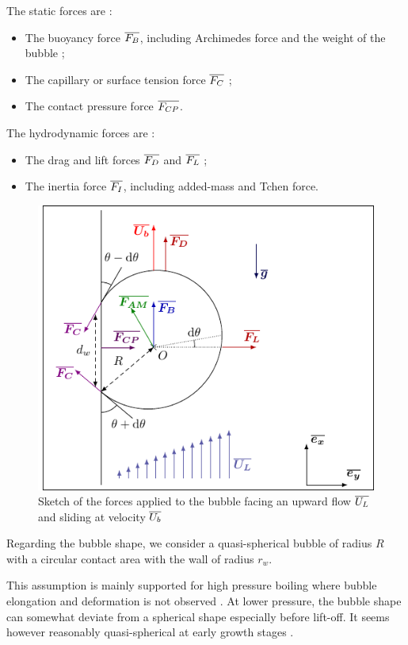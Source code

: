 \npar

The static forces are : 

\begin{itemize}
\item The buoyancy force $\overline{F_{B}}$, including Archimedes force and the weight of the bubble ;
\item The capillary or surface tension force $\overline{F_{C}}$ ;
\item The contact pressure force $\overline{F_{CP}}$.
\end{itemize}


The hydrodynamic forces are :

\begin{itemize}
\item The drag and lift forces $\overline{F_{D}}$ and $\overline{F_{L}}$ ;
\item The inertia force $\overline{F_{I}}$, including added-mass and Tchen force.
\end{itemize}



\begin{figure}[h!]
\centering
%
\includegraphics[width=0.6\linewidth]{img/bub_dyn/bub_bdf.pdf}
\caption{Sketch of the forces applied to the bubble facing an upward flow $\overline{U_{L}}$ and sliding at velocity $\overline{U_{b}}$}
\label{fig:bub_forces}
\end{figure}



Regarding the bubble shape, we consider a quasi-spherical bubble of radius $R$ with a circular contact area with the wall of radius $r_{w}$. 


\begin{remark*}{}
This assumption is mainly supported for high pressure boiling where bubble elongation and deformation is not observed \cite{kossolapov_experimental_2021}. At lower pressure, the bubble shape can somewhat deviate from a spherical shape especially before lift-off. It seems however reasonably quasi-spherical at early growth stages \cite{maity_effect_2000}. 
\end{remark*} 


